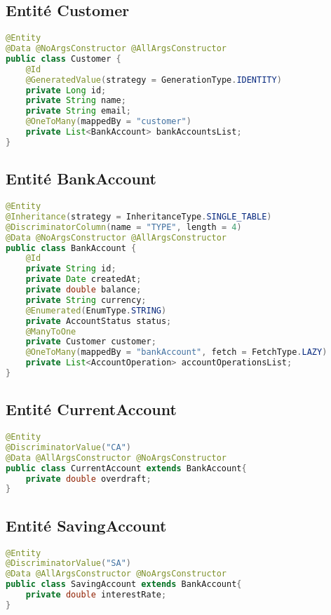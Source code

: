 \documentclass[12pt,a4paper]{report}
\begin{document}
\subsection{Entité Customer}
\begin{lstlisting}[language=Java, caption=Entité Customer.java]
@Entity
@Data @NoArgsConstructor @AllArgsConstructor
public class Customer {
    @Id
    @GeneratedValue(strategy = GenerationType.IDENTITY)
    private Long id;
    private String name;
    private String email;
    @OneToMany(mappedBy = "customer")
    private List<BankAccount> bankAccountsList;
}
\end{lstlisting}

\subsection{Entité BankAccount}
\begin{lstlisting}[language=Java, caption=Entité BankAccount.java]
@Entity
@Inheritance(strategy = InheritanceType.SINGLE_TABLE)
@DiscriminatorColumn(name = "TYPE", length = 4)
@Data @NoArgsConstructor @AllArgsConstructor
public class BankAccount {
    @Id
    private String id;
    private Date createdAt;
    private double balance;
    private String currency;
    @Enumerated(EnumType.STRING)
    private AccountStatus status;
    @ManyToOne
    private Customer customer;
    @OneToMany(mappedBy = "bankAccount", fetch = FetchType.LAZY)
    private List<AccountOperation> accountOperationsList;
}
\end{lstlisting}

\subsection{Entité CurrentAccount}
\begin{lstlisting}[language=Java, caption=Entité CurrentAccount.java]
@Entity
@DiscriminatorValue("CA")
@Data @AllArgsConstructor @NoArgsConstructor
public class CurrentAccount extends BankAccount{
    private double overdraft;
}
\end{lstlisting}

\subsection{Entité SavingAccount}
\begin{lstlisting}[language=Java, caption=Entité SavingAccount.java]
@Entity
@DiscriminatorValue("SA")
@Data @AllArgsConstructor @NoArgsConstructor
public class SavingAccount extends BankAccount{
    private double interestRate;
}
\end{lstlisting}
\end{document}
